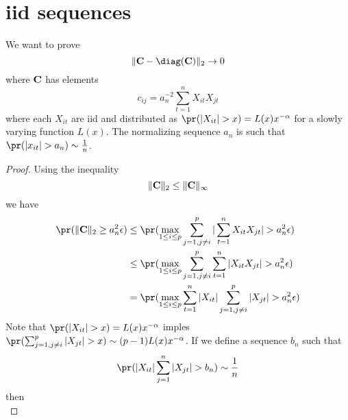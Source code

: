 \documentclass{article}
\begin{document}
\section{iid sequences}
We want to prove
\[
\|\mtx C - \diag(\mtx C)\|_2 \to 0
\]
where $\mathbf{C}$ has elements
\[
c_{ij} = a_n^{-2} \sum_{t=1}^n X_{it} X_{jt}
\]
where each $X_{it}$ are iid and distributed as $\pr(|X_{it}| > x) = L(x)
x^{-\alpha}$ for a slowly varying function $L(x)$. The normalizing
sequence $a_n$ is such that $\pr(|x_{it}| > a_n) \sim {1 \over n}$.
\begin{proof}
  Using the inequality
  \[
  \|\mathbf{C}\|_2 \leq \|\mathbf{C}\|_\infty
  \]
  we have
  \begin{align*}
  \pr(\|\mtx C\|_2 \geq a_n^2 \epsilon) & \leq
  \pr(\max_{1\leq i \leq p} \sum_{j=1, j\neq i}^p |\sum_{t=1}^n
  X_{it} X_{jt}| > a_n^2 \epsilon) \\
  &\leq \pr(\max_{1\leq i \leq p} \sum_{j=1, j\neq i}^p \sum_{t=1}^n
  |X_{it} X_{jt}| > a_n^2 \epsilon) \\
  &= \pr(\max_{1\leq i \leq p} \sum_{t=1}^n |X_{it}| \sum_{j=1, j\neq i}^p
  |X_{jt}| > a_n^2 \epsilon) \\
  \end{align*}
  Note that $\pr(|X_{it}| > x) = L(x) x^{-\alpha}$ imples $\pr(\sum_{j=1,
    j\neq i}^p |X_{jt}| > x) \sim (p-1)L(x) x^{-\alpha}$. If we define
  a sequence $b_n$ such that
  \[
  \pr(|X_{it}| \sum_{j=1}^n |X_{jt}| > b_n) \sim {1 \over n}
  \]
  then
  \[
  
  \]
\end{proof}
\end{document}
